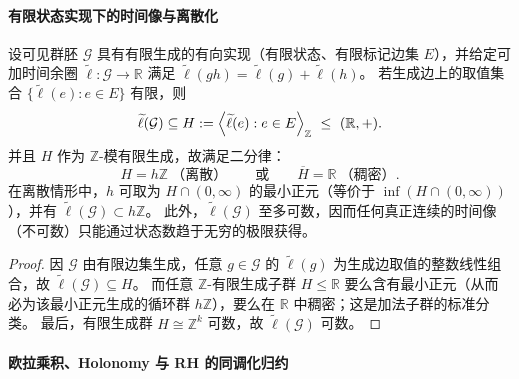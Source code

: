 \paragraph{有限状态实现下的时间像与离散化}

\begin{proposition}\label{prop:xi-finite-state-time-image-discrete-or-dense}
设可见群胚 \(\mathcal G\) 具有有限生成的有向实现（有限状态、有限标记边集 \(E\)），并给定可加时间余圈 \(\widetilde{\ell}:\mathcal G\to\mathbb R\) 满足 \(\widetilde{\ell}(gh)=\widetilde{\ell}(g)+\widetilde{\ell}(h)\)。
若生成边上的取值集合 \(\{\widetilde{\ell}(e):e\in E\}\) 有限，则
\[
\widetilde{\ell}(\mathcal G)\subseteq
H:=\Bigl\langle \widetilde{\ell}(e):e\in E\Bigr\rangle_{\mathbb Z}\ \le\ (\mathbb R,+).
\]
并且 \(H\) 作为 \(\mathbb Z\)-模有限生成，故满足二分律：
\[
H=h\mathbb Z\ \text{（离散）}\qquad\text{或}\qquad \overline{H}=\mathbb R\ \text{（稠密）}.
\]
在离散情形中，\(h\) 可取为 \(H\cap(0,\infty)\) 的最小正元（等价于 \(\inf(H\cap(0,\infty))\)），并有 \(\widetilde{\ell}(\mathcal G)\subset h\mathbb Z\)。
此外，\(\widetilde{\ell}(\mathcal G)\) 至多可数，因而任何真正连续的时间像（不可数）只能通过状态数趋于无穷的极限获得。
\end{proposition}

\begin{proof}
因 \(\mathcal G\) 由有限边集生成，任意 \(g\in\mathcal G\) 的 \(\widetilde{\ell}(g)\) 为生成边取值的整数线性组合，故 \(\widetilde{\ell}(\mathcal G)\subseteq H\)。
而任意 \(\mathbb Z\)-有限生成子群 \(H\le\mathbb R\) 要么含有最小正元（从而必为该最小正元生成的循环群 \(h\mathbb Z\)），要么在 \(\mathbb R\) 中稠密；这是加法子群的标准分类。
最后，有限生成群 \(H\cong \mathbb Z^k\) 可数，故 \(\widetilde{\ell}(\mathcal G)\) 可数。
\end{proof}

\paragraph{欧拉乘积、Holonomy 与 RH 的同调化归约}

